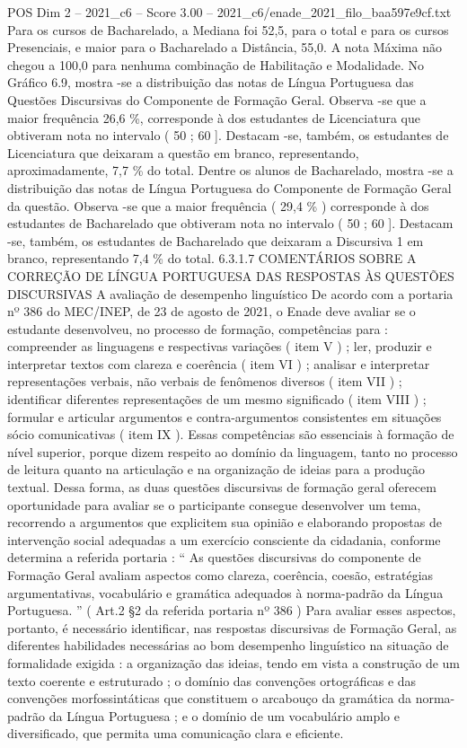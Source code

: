 \begin{textsample}{POS Dim 2 – 2021\_c6 – Score 3.00 – 2021\_c6/enade\_2021\_filo\_baa597e9cf.txt}
Para os cursos de Bacharelado, a Mediana foi 52,5, para o total e para os cursos Presenciais, e maior para o Bacharelado a Distância, 55,0.
A nota Máxima não chegou a 100,0 para nenhuma combinação de Habilitação e Modalidade.
No Gráfico 6.9, mostra -se a distribuição das notas de Língua Portuguesa das Questões Discursivas do Componente de Formação Geral.
Observa -se que a maior frequência 26,6 \%, corresponde à dos estudantes de Licenciatura que obtiveram nota no intervalo ( 50 ; 60 ].
Destacam -se, também, os estudantes de Licenciatura que deixaram a questão em branco, representando, aproximadamente, 7,7 \% do total.
Dentre os alunos de Bacharelado, mostra -se a distribuição das notas de Língua Portuguesa do Componente de Formação Geral da questão.
Observa -se que a maior frequência ( 29,4 \% ) corresponde à dos estudantes de Bacharelado que obtiveram nota no intervalo ( 50 ; 60 ].
Destacam -se, também, os estudantes de Bacharelado que deixaram a Discursiva 1 em branco, representando 7,4 \% do total. 6.3.1.7 COMENTÁRIOS SOBRE A CORREÇÃO DE LÍNGUA PORTUGUESA DAS RESPOSTAS ÀS QUESTÕES DISCURSIVAS A avaliação de desempenho linguístico De acordo com a portaria nº 386 do MEC/INEP, de 23 de agosto de 2021, o Enade deve avaliar se o estudante desenvolveu, no processo de formação, competências para : compreender as linguagens e respectivas variações ( item V ) ; ler, produzir e interpretar textos com clareza e coerência ( item VI ) ; analisar e interpretar representações verbais, não verbais de fenômenos diversos ( item VII ) ; identificar diferentes representações de um mesmo significado ( item VIII ) ; formular e articular argumentos e contra-argumentos consistentes em situações sócio comunicativas ( item IX ).
Essas competências são essenciais à formação de nível superior, porque dizem respeito ao domínio da linguagem, tanto no processo de leitura quanto na articulação e na organização de ideias para a produção textual.
Dessa forma, as duas questões discursivas de formação geral oferecem oportunidade para avaliar se o participante consegue desenvolver um tema, recorrendo a argumentos que explicitem sua opinião e elaborando propostas de intervenção social adequadas a um exercício consciente da cidadania, conforme determina a referida portaria : “ As questões discursivas do componente de Formação Geral avaliam aspectos como clareza, coerência, coesão, estratégias argumentativas, vocabulário e gramática adequados à norma-padrão da Língua Portuguesa. ” ( Art.2 §2 da referida portaria nº 386 ) Para avaliar esses aspectos, portanto, é necessário identificar, nas respostas discursivas de Formação Geral, as diferentes habilidades necessárias ao bom desempenho linguístico na situação de formalidade exigida : a organização das ideias, tendo em vista a construção de um texto coerente e estruturado ; o domínio das convenções ortográficas e das convenções morfossintáticas que constituem o arcabouço da gramática da norma-padrão da Língua Portuguesa ; e o domínio de um vocabulário amplo e diversificado, que permita uma comunicação clara e eficiente.

\end{textsample}
